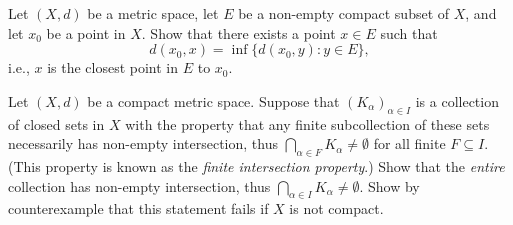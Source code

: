 \begin{exercise}\label{ex 1.5.14}
    Let \((X, d)\) be a metric space, let \(E\) be a non-empty compact subset of \(X\), and let \(x_0\) be a point in \(X\).
    Show that there exists a point \(x \in E\) such that
    \[
        d(x_0, x) = \inf\{d(x_0, y) : y \in E\},
    \]
    i.e., \(x\) is the closest point in \(E\) to \(x_0\).
\end{exercise}

\begin{exercise}\label{ex 1.5.15}
    Let \((X, d)\) be a compact metric space.
    Suppose that \((K_{\alpha})_{\alpha \in I}\) is a collection of closed sets in \(X\) with the property that any finite subcollection of these sets necessarily has non-empty intersection, thus \(\bigcap_{\alpha \in F} K_{\alpha} \neq \emptyset\) for all finite \(F \subseteq I\).
    (This property is known as the \emph{finite intersection property}.)
    Show that the \emph{entire} collection has non-empty intersection, thus \(\bigcap_{\alpha \in I} K_{\alpha} \neq \emptyset\).
    Show by counterexample that this statement fails if \(X\) is not compact.
\end{exercise}